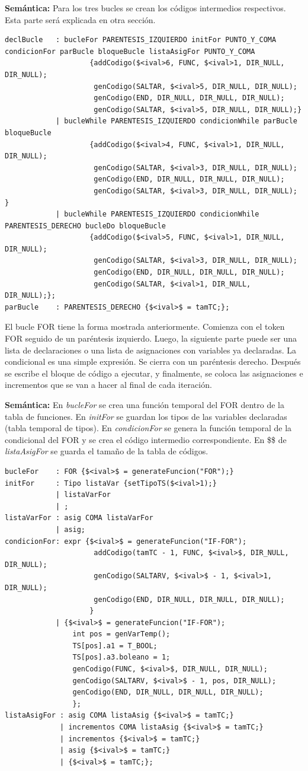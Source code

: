 \documentclass[a4paper,12pt]{article}
\begin{document}
\begin{enumerate}
\begin{enumerate}
\begin{itemize}
    \textbf{Semántica:} Para los tres bucles se crean los códigos intermedios respectivos. Esta parte será explicada en otra sección.
    \begin{lstlisting}
declBucle	: bucleFor PARENTESIS_IZQUIERDO initFor PUNTO_Y_COMA condicionFor parBucle bloqueBucle listaAsigFor PUNTO_Y_COMA
					{addCodigo($<ival>6, FUNC, $<ival>1, DIR_NULL, DIR_NULL);
					 genCodigo(SALTAR, $<ival>5, DIR_NULL, DIR_NULL);
					 genCodigo(END, DIR_NULL, DIR_NULL, DIR_NULL);
					 genCodigo(SALTAR, $<ival>5, DIR_NULL, DIR_NULL);}
			| bucleWhile PARENTESIS_IZQUIERDO condicionWhile parBucle bloqueBucle
					{addCodigo($<ival>4, FUNC, $<ival>1, DIR_NULL, DIR_NULL);
					 genCodigo(SALTAR, $<ival>3, DIR_NULL, DIR_NULL);
					 genCodigo(END, DIR_NULL, DIR_NULL, DIR_NULL);
					 genCodigo(SALTAR, $<ival>3, DIR_NULL, DIR_NULL);	}
			| bucleWhile PARENTESIS_IZQUIERDO condicionWhile PARENTESIS_DERECHO bucleDo bloqueBucle
					{addCodigo($<ival>5, FUNC, $<ival>1, DIR_NULL, DIR_NULL);
					 genCodigo(SALTAR, $<ival>3, DIR_NULL, DIR_NULL);
					 genCodigo(END, DIR_NULL, DIR_NULL, DIR_NULL);
					 genCodigo(SALTAR, $<ival>1, DIR_NULL, DIR_NULL);};
parBucle	: PARENTESIS_DERECHO {$<ival>$ = tamTC;};
    \end{lstlisting}
    El bucle FOR tiene la forma mostrada anteriormente. Comienza con el token FOR seguido de un paréntesis izquierdo. Luego, la siguiente parte puede ser
    una lista de declaraciones o una lista de asignaciones con variables ya declaradas. La condicional es una simple expresión. Se cierra con un paréntesis derecho.
    Después se escribe el bloque de código a ejecutar, y finalmente, se coloca las asignaciones e incrementos que se van a hacer al final de cada iteración.
    
    \textbf{Semántica:} En \textit{bucleFor} se crea una función temporal del FOR dentro de la tabla de funciones.
    En \textit{initFor} se guardan los tipos de las variables declaradas (tabla temporal de tipos).
    En \textit{condicionFor} se genera la función temporal de la condicional del FOR y se crea el código intermedio correspondiente.
    En \$\$ de \textit{listaAsigFor} se guarda el tamaño de la tabla de códigos.
    \begin{lstlisting}
bucleFor	: FOR {$<ival>$ = generateFuncion("FOR");}
initFor		: Tipo listaVar {setTipoTS($<ival>1);}
			| listaVarFor
			| ;
listaVarFor : asig COMA listaVarFor
			| asig;	
condicionFor: expr {$<ival>$ = generateFuncion("IF-FOR");
					 addCodigo(tamTC - 1, FUNC, $<ival>$, DIR_NULL, DIR_NULL);
					 genCodigo(SALTARV, $<ival>$ - 1, $<ival>1, DIR_NULL);
					 genCodigo(END, DIR_NULL, DIR_NULL, DIR_NULL);
					}
			| {$<ival>$ = generateFuncion("IF-FOR");
				int pos = genVarTemp();
				TS[pos].a1 = T_BOOL;
				TS[pos].a3.boleano = 1;
				genCodigo(FUNC, $<ival>$, DIR_NULL, DIR_NULL);
				genCodigo(SALTARV, $<ival>$ - 1, pos, DIR_NULL);
				genCodigo(END, DIR_NULL, DIR_NULL, DIR_NULL);
				};
listaAsigFor : asig COMA listaAsig {$<ival>$ = tamTC;}
 			 | incrementos COMA listaAsig {$<ival>$ = tamTC;}
 			 | incrementos {$<ival>$ = tamTC;}
			 | asig {$<ival>$ = tamTC;}
			 | {$<ival>$ = tamTC;};



\end{lstlisting}
\end{itemize}
\end{enumerate}
\end{enumerate}
\end{document}
